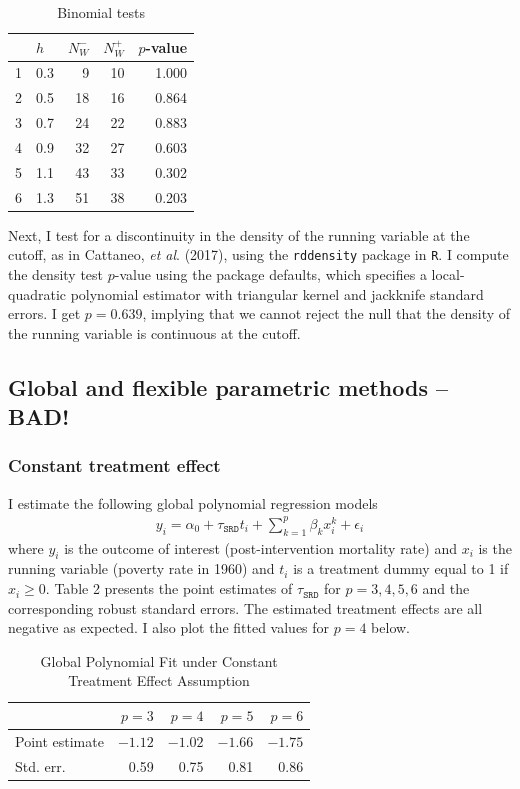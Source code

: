 \documentclass[12pt]{article}
\newcommand{\e}{\epsilon}
\begin{document}
\begin{table}[htpb!]
\centering
\caption{Binomial tests}
\begin{tabular}{llrrr}
  \hline
 & $h$ & $N_W^-$ & $N_W^+$ & $p$-value \\ 
  \hline
1 & 0.3 & 9 & 10 & 1.000 \\ 
  2 & 0.5 & 18 & 16 & 0.864 \\ 
  3 & 0.7 & 24 & 22 & 0.883 \\ 
  4 & 0.9 & 32 & 27 & 0.603 \\ 
  5 & 1.1 & 43 & 33 & 0.302 \\ 
  6 & 1.3 & 51 & 38 & 0.203 \\ 
   \hline
\end{tabular}
\end{table}

Next, I test for a discontinuity in the density of the running variable at the cutoff, as in Cattaneo, \textit{et al}. (2017), using the \verb|rddensity| package in \verb|R|. I compute the density test $p$-value using the package defaults, which specifies a local-quadratic polynomial estimator with triangular kernel and jackknife standard errors. I get $p = 0.639$, implying that we cannot reject the null that the density of the running variable is continuous at the cutoff.

\subsection{Global and flexible parametric methods -- BAD!}
\subsubsection{Constant treatment effect}
I estimate the following global polynomial regression models
\begin{align*}
y_i = \alpha_0 + \tau_{\texttt{SRD}} t_i + \sum_{k=1}^p \beta_k x_i^k + \e_i
\end{align*}
where $y_i$ is the outcome of interest (post-intervention mortality rate) and $x_i$ is the running variable (poverty rate in 1960) and $t_i$ is a treatment dummy equal to 1 if $x_i \geq 0$. Table 2 presents the point estimates of $\tau_{\texttt{SRD}}$ for $p=3,4,5,6$ and the corresponding robust standard errors. The estimated treatment effects are all negative as expected. I also plot the fitted values for $p=4$ below.

\begin{table}[htpb!]
\centering
\caption{Global Polynomial Fit under Constant Treatment Effect Assumption}
\begin{tabular}{lrrrr}
  \hline
 & $p=3$ & $p=4$ & $p=5$ & $p=6$ \\ 
  \hline
Point estimate& $-1.12$ & $-1.02$ & $-1.66$ & $-1.75$ \\ 
Std. err. & 0.59 & 0.75 & 0.81 & 0.86 \\ 
   \hline
\end{tabular}
\end{table}
\captionsetup[figure]{font=small,skip=0pt}
\end{document}
